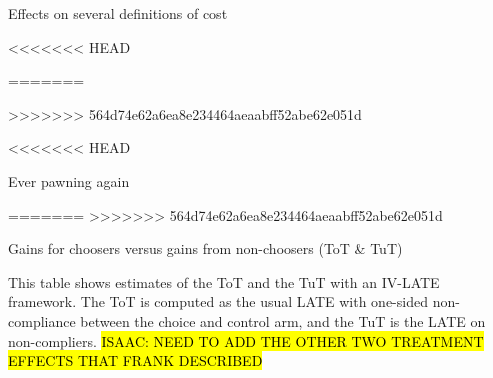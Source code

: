 \documentclass[oneside,11pt]{article}
\begin{document}
{\begin{landscape}
\vspace{3ex}

\end{landscape}

\begin{table}[H]
\caption{Effects on several definitions of cost}
\label{table_robustness_fc}
\begin{center}
\scriptsize{}
\end{center}
 \scriptsize
\end{table}


<<<<<<< HEAD



\cleardoublepage
=======

>>>>>>> 564d74e62a6ea8e234464aeaabff52abe62e051d



<<<<<<< HEAD
\begin{table}[H]
\caption{Ever pawning again}
\label{repeat_loans}
\begin{center}
\scriptsize{}
\end{center}
 \scriptsize

\end{table}

\cleardoublepage
=======
>>>>>>> 564d74e62a6ea8e234464aeaabff52abe62e051d

\begin{table}[H]
\caption{Gains for choosers versus gains from non-choosers (ToT \& TuT)}
\label{tot_tut}
\begin{center}
\scriptsize{}
\end{center}
 \scriptsize This table shows estimates of the ToT and the TuT with an IV-LATE framework. The ToT is computed as the usual LATE with one-sided non-compliance between the choice and control arm, and the TuT is the LATE on non-compliers. 
 \hl{ISAAC: NEED TO ADD THE OTHER TWO TREATMENT EFFECTS THAT FRANK DESCRIBED}
\end{table}





\vspace{.3in}

}
\end{document}
